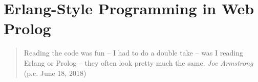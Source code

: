 \documentclass{tlp}
\begin{document}
%
%
%
%
%
%
%


\section{Erlang-Style Programming in Web Prolog}\label{sec:language}

\vspace{1mm}

\begin{quote}
Reading the code was fun -- I had to do a double take -- was I reading Erlang or Prolog -- they often look pretty much the same. \flushright \textit{Joe Armstrong} (p.c. June 18, 2018)
\end{quote}
\end{document}

